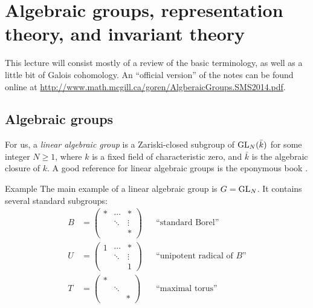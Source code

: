 
\section{Algebraic groups, representation theory, and invariant theory}





This lecture will consist mostly of a review of the basic terminology, as 
well as a little bit of Galois cohomology. An ``official version'' of the 
notes can be found online at 
\url{http://www.math.mcgill.ca/goren/AlgberaicGroups.SMS2014.pdf}. 





\subsection{Algebraic groups}

For us, a \emph{linear algebraic group} is a Zariski-closed subgroup of 
$\operatorname{GL}_N(\bar k)$ for some integer $N\geqslant 1$, where $k$ is a 
fixed field of characteristic zero, and $\bar k$ is the algebraic closure of 
$k$. A good reference for linear algebraic groups is the eponymous book 
\cite{b91}. 

\begin{enonce}[remark]{Example}
The main example of a linear algebraic group is $G=\operatorname{GL}_N$. It 
contains several standard subgroups:
\begin{align*}
  B &= \begin{pmatrix} \ast & \cdots & \ast \\ & \ddots & \vdots \\ & & \ast \end{pmatrix} && \text{``standard Borel''} \\
  U &= \begin{pmatrix} 1 & \cdots & \ast \\ & \ddots & \vdots \\ & & 1\end{pmatrix} && \text{``unipotent radical of $B$''} \\
  T &= \begin{pmatrix} \ast \\ & \ddots \\ & & \ast \end{pmatrix} && \text{``maximal torus''}
\end{align*}
\end{enonce}

